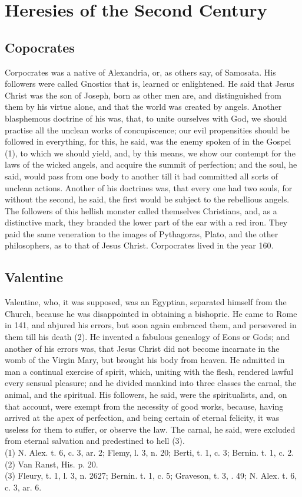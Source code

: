 \documentclass[12pt]{book}
\begin{document}
\chapter{Heresies of the Second Century}
\section{Copocrates}
Corpocrates was a native of Alexandria, or, as others say, of Samosata. His followers were called
Gnostics that is, learned or enlightened. He said that Jesus Christ was the son of Joseph, born as other
men are, and distinguished from them by his virtue alone, and that the world was created by angels.
Another blasphemous doctrine of his was, that, to unite ourselves with God, we should practise all the
unclean works of concupiscence; our evil propensities should be followed in everything, for this, he said,
was the enemy spoken of in the Gospel (1), to which we should yield, and, by this means, we show our
contempt for the laws of the wicked angels, and acquire the summit of perfection; and the soul, he said,
would pass from one body to another till it had committed all sorts of unclean actions. Another of his
doctrines was, that every one had two souls, for without the second, he said, the first would be subject to
the rebellious angels. The followers of this hellish monster called themselves Christians, and, as a
distinctive mark, they branded the lower part of the ear with a red iron. They paid the same veneration to
the images of Pythagoras, Plato, and the other philosophers, as to that of Jesus Christ. Corpocrates lived
in the year 160.
\section{Valentine}
Valentine, who, it was supposed, was an Egyptian, separated himself from the Church, because he was
disappointed in obtaining a bishopric. He came to Rome in 141, and abjured his errors, but soon again
embraced them, and persevered in them till his death (2). He invented a fabulous genealogy of Eons or
Gods; and another of his errors was, that Jesus Christ did not become incarnate in the womb of the Virgin
Mary, but brought his body from heaven. He admitted in man a continual exercise of spirit, which,
uniting with the flesh, rendered lawful every sensual pleasure; and he divided mankind into three classes
the carnal, the animal, and the spiritual. His followers, he said, were the spiritualists, and, on that
account, were exempt from the necessity of good works, because, having arrived at the apex of
perfection, and being certain of eternal felicity, it was useless for them to suffer, or observe the law. The
carnal, he said, were excluded from eternal salvation and predestined to hell (3).\\
(1) N. Alex. t. 6, c. 3, ar. 2; Flemy, l. 3, n. 20; Berti, t. 1, c. 3; Bernin. t. 1, c. 2. \\
(2) Van Ranst, His. p. 20.\\
(3) Fleury, t. 1, l. 3, n. 2627; Bernin. t. 1, c. 5; Graveson, t. 3, . 49; N. Alex. t. 6, c. 3, ar. 6.\\
\end{document}
